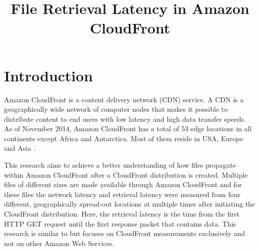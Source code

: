 \documentclass[conference]{IEEEtran}
\begin{document}
%
\title{File Retrieval Latency in Amazon CloudFront}


\author{
\and
{}
}


\maketitle

\IEEEpeerreviewmaketitle


\section{Introduction}
Amazon CloudFront is a content delivery network (CDN) service. A CDN is a geographically wide network of computer nodes that makes it possible to distribute content to end users with low latency and high data transfer speeds. As of November 2014, Amazon CloudFront has a total of 53 edge locations in all continents except Africa and Antarctica. Most of them reside in USA, Europe and Asia \cite{CloudFront_product_details}.

This research aims to achieve a better understanding of how files propagate within Amazon CloudFront after a CloudFront distribution is created.  Multiple files of different sizes are made available through Amazon CloudFront and for these files the network latency and retrieval latency were measured from four different, geographically spread-out locations at multiple times after initiating the CloudFront distribution. Here, the retrieval latency is the time from the first HTTP GET request until the first response packet that contains data. This research is similar to \cite{bermudez2013exploring} but focuses on CloudFront measurements exclusively and not on other Amazon Web Services.
\end{document}
